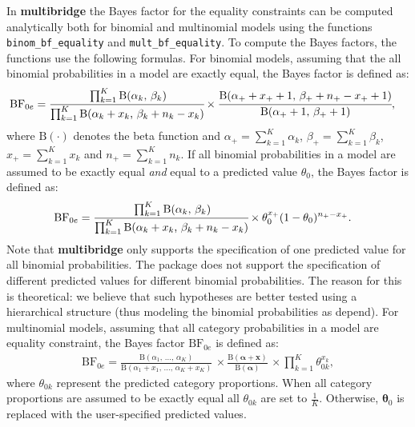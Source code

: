 \documentclass[
  english,
  man,floatsintext]{apa6}
\begin{document}
\noindent In \textbf{multibridge} the Bayes factor for the equality constraints can be computed analytically both for binomial and multinomial models using the functions \texttt{binom\_bf\_equality} and \texttt{mult\_bf\_equality}. To compute the Bayes factors, the functions use the following formulas. For binomial models, assuming that the all binomial probabilities in a model are exactly equal, the Bayes factor is defined as:
\begin{align*}
\text{BF}_{0e}
&= \cfrac{\prod_{k=1}^K \text{B}(\alpha_k \text{, } \beta_k)}{\prod_{k=1}^K \text{B}(\alpha_k + x_k\text{, } \beta_k + n_k - x_k)} \times \cfrac{\text{B}(\alpha_+ + x_+ + 1\text{, } \beta_+ + n_+ - x_+ + 1)}{\text{B}(\alpha_+ + 1\text{, }\beta_+ + 1)},
\end{align*}
where \(\text{B}(\cdot)\) denotes the beta function and \(\alpha_+ = \sum_{k=1}^K\alpha_k\), \(\beta_+ = \sum_{k=1}^K\beta_k\), \(x_+ = \sum_{k=1}^K x_k\) and \(n_+ = \sum_{k=1}^K n_k\). If all binomial probabilities in a model are assumed to be exactly equal \textit{and} equal to a predicted value \(\theta_{0}\), the Bayes factor is defined as:
\begin{align*}
\text{BF}_{0e}
&= \cfrac{\prod_{k=1}^K \text{B}(\alpha_k \text{, } \beta_k)}{\prod_{k=1}^K \text{B}(\alpha_k + x_k\text{, } \beta_k + n_k - x_k)} \times \theta_{0}^{x_+} (1 - \theta_{0})^{n_+ - x_+}.
\end{align*}
Note that \textbf{multibridge} only supports the specification of one predicted value for all binomial probabilities. The package does not support the specification of different predicted values for different binomial probabilities. The reason for this is theoretical: we believe that such hypotheses are better tested using a hierarchical structure (thus modeling the binomial probabilities as depend). For multinomial models, assuming that all category probabilities in a model are equality constraint, the Bayes factor \(\text{BF}_{0e}\) is defined as:
\begin{align*}
\text{BF}_{0e} =  \frac{
 \text{B}\left(\alpha_{1}\text{, }\dots\text{, }\alpha_K\right)}{\text{B}\left(\alpha_1+x_1\text{, }\dots\text{, }\alpha_K+x_K\right)} \, \times 
\frac{\text{B}(\boldsymbol{\alpha}+\mathbf{x})}{\text{B}(\boldsymbol{\alpha})} \, \times  \prod_{k=1}^K \theta_{0k}^{x_k},
\end{align*}
where \(\theta_{0k}\) represent the predicted category proportions. When all category proportions are assumed to be exactly equal all \(\theta_{0k}\) are set to \(\frac{1}{K}\). Otherwise, \(\boldsymbol{\theta}_{0}\) is replaced with the user-specified predicted values.
\end{document}

